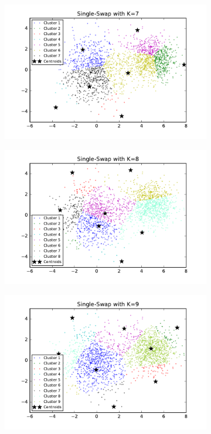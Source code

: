 \begin{figure}[htb]
\begin{subfigure}[b]{0.475\textwidth}
            \includegraphics[width=\textwidth]{./figures/clustering_singleSwap_7.pdf}
        \end{subfigure}
        \hfill
        \begin{subfigure}[b]{0.475\textwidth}  
            \centering 
            \includegraphics[width=\textwidth]{./figures/clustering_singleSwap_8.pdf}
        \end{subfigure}
        \begin{subfigure}[b]{0.475\textwidth}   
            \centering 
            \includegraphics[width=\textwidth]{./figures/clustering_singleSwap_9.pdf}

\end{subfigure}
\end{figure}

